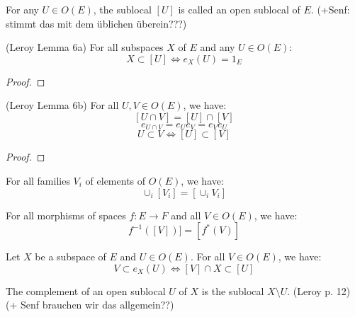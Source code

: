 \begin{definition}
    \label{def:open_sublocal}
    For any $U \in O(E)$, the sublocal $[U]$ is called an open sublocal of $E$.
    (+Senf: stimmt das mit dem üblichen überein???)
\end{definition}

\begin{lemma}
(Leroy Lemma 6a)
    \label{lem:open_subspaces_a}
    For all subspaces $X$ of $E$ and any $U \in O(E)$:
    \[X \subset [U] \iff e_X(U) = 1_E\]
\end{lemma}
\begin{proof}

\end{proof}

\begin{lemma}
(Leroy Lemma 6b)
    For all $U, V \in O(E)$, we have:
    \[[U \cap V] = [U] \cap [V]\]
    \[e_{U \cap V} = e_Ue_V=e_Ve_U\]
    \[U \subset V \iff [U] \subset [V]\]
    \label{lem:open_subspaces_b}
\end{lemma}
\begin{proof}
\end{proof}

\begin{lemma}
    For all families $V_i$ of elements of $O(E)$, we have:
    \[\cup_i[V_i] = [\cup_iV_i]\]

    \label{lem:open_subspaces_c}
\end{lemma}

\begin{lemma}
    For all morphisms of spaces $f: E \to F$ and all $V \in O(E)$, we have:
    \[f^{-1}([V])] = [f^*(V)]\]
    \label{lem:open_subspaces_d}
\end{lemma}

\begin{lemma}
    Let $X$ be a subspace of $E$ and $U \in O(E)$. For all $V \in O(E)$, we have:
    \[V \subset e_X(U) \iff [V] \cap X \subset [U]\]
    \label{lem:open_subspaces_7}
\end{lemma}


\begin{definition}[Complement]
    \label{def:complement}
    The complement of an open sublocal $U$ of $X$ is the sublocal $X \setminus U$.
    (Leroy p. 12) (+ Senf brauchen wir das allgemein??)
\end{definition}


